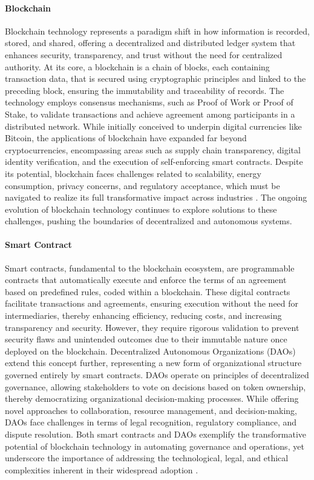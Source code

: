 \documentclass{article}
\begin{document}
\paragraph{Blockchain}
Blockchain technology represents a paradigm shift in how information is recorded, stored, and shared, offering a decentralized and distributed ledger system that enhances security, transparency, and trust without the need for centralized authority. At its core, a blockchain is a chain of blocks, each containing transaction data, that is secured using cryptographic principles and linked to the preceding block, ensuring the immutability and traceability of records. The technology employs consensus mechanisms, such as Proof of Work or Proof of Stake, to validate transactions and achieve agreement among participants in a distributed network. While initially conceived to underpin digital currencies like Bitcoin, the applications of blockchain have expanded far beyond cryptocurrencies, encompassing areas such as supply chain transparency, digital identity verification, and the execution of self-enforcing smart contracts. Despite its potential, blockchain faces challenges related to scalability, energy consumption, privacy concerns, and regulatory acceptance, which must be navigated to realize its full transformative impact across industries \cite{Nakamoto2008, Swan2015}. The ongoing evolution of blockchain technology continues to explore solutions to these challenges, pushing the boundaries of decentralized and autonomous systems.

\paragraph{Smart Contract}
Smart contracts, fundamental to the blockchain ecosystem, are programmable contracts that automatically execute and enforce the terms of an agreement based on predefined rules, coded within a blockchain. These digital contracts facilitate transactions and agreements, ensuring execution without the need for intermediaries, thereby enhancing efficiency, reducing costs, and increasing transparency and security. However, they require rigorous validation to prevent security flaws and unintended outcomes due to their immutable nature once deployed on the blockchain. Decentralized Autonomous Organizations (DAOs) extend this concept further, representing a new form of organizational structure governed entirely by smart contracts. DAOs operate on principles of decentralized governance, allowing stakeholders to vote on decisions based on token ownership, thereby democratizing organizational decision-making processes. While offering novel approaches to collaboration, resource management, and decision-making, DAOs face challenges in terms of legal recognition, regulatory compliance, and dispute resolution. Both smart contracts and DAOs exemplify the transformative potential of blockchain technology in automating governance and operations, yet underscore the importance of addressing the technological, legal, and ethical complexities inherent in their widespread adoption \cite{Szabo1997, Buterin2014DAO}.
\end{document}
